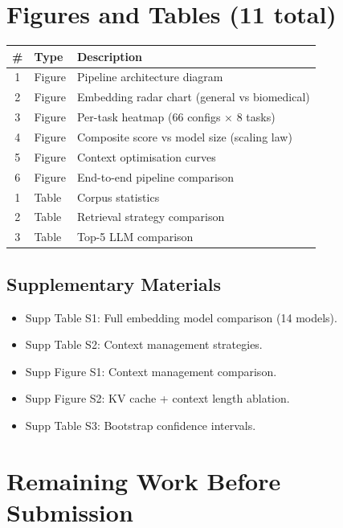 \documentclass[11pt,a4paper]{article}
\begin{document}
\section{Figures and Tables (11 total)}

\begin{longtable}{@{}clp{7cm}@{}}
\toprule
\# & Type & Description \\
\midrule
1 & Figure & Pipeline architecture diagram \\
2 & Figure & Embedding radar chart (general vs biomedical) \\
3 & Figure & Per-task heatmap (66 configs $\times$ 8 tasks) \\
4 & Figure & Composite score vs model size (scaling law) \\
5 & Figure & Context optimisation curves \\
6 & Figure & End-to-end pipeline comparison \\
1 & Table  & Corpus statistics \\
2 & Table  & Retrieval strategy comparison \\
3 & Table  & Top-5 LLM comparison \\
\bottomrule
\end{longtable}

\subsection{Supplementary Materials}

\begin{itemize}
  \item Supp Table S1: Full embedding model comparison (14 models).
  \item Supp Table S2: Context management strategies.
  \item Supp Figure S1: Context management comparison.
  \item Supp Figure S2: KV cache + context length ablation.
  \item Supp Table S3: Bootstrap confidence intervals.
\end{itemize}

\section{Remaining Work Before Submission}
\end{document}
